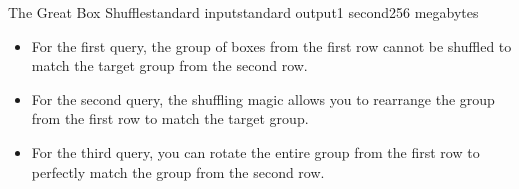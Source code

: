 \begin{problem}{The Great Box Shuffle}{standard input}{standard output}{1 second}{256 megabytes}
\Example

\begin{example}
%
\end{example}

\Note
\begin{itemize}
    \item For the first query, the group of boxes from the first row cannot be shuffled to match the target group from the second row.
    \item For the second query, the shuffling magic allows you to rearrange the group from the first row to match the target group.
    \item For the third query, you can rotate the entire group from the first row to perfectly match the group from the second row.
\end{itemize}

\end{problem}

